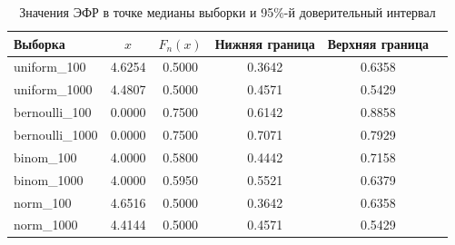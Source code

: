 \begin{table}[h!]
\centering
\caption{Значения ЭФР в точке медианы выборки и 95\%-й доверительный интервал}
\small
\begin{tabular}{lccccc}
\toprule
Выборка & $x$ & $F_n(x)$ & Нижняя граница & Верхняя граница \\
\midrule
uniform\_100 & 4.6254 & 0.5000 & 0.3642 & 0.6358 \\
uniform\_1000 & 4.4807 & 0.5000 & 0.4571 & 0.5429 \\
bernoulli\_100 & 0.0000 & 0.7500 & 0.6142 & 0.8858 \\
bernoulli\_1000 & 0.0000 & 0.7500 & 0.7071 & 0.7929 \\
binom\_100 & 4.0000 & 0.5800 & 0.4442 & 0.7158 \\
binom\_1000 & 4.0000 & 0.5950 & 0.5521 & 0.6379 \\
norm\_100 & 4.6516 & 0.5000 & 0.3642 & 0.6358 \\
norm\_1000 & 4.4144 & 0.5000 & 0.4571 & 0.5429 \\
\bottomrule
\end{tabular}
\end{table}
